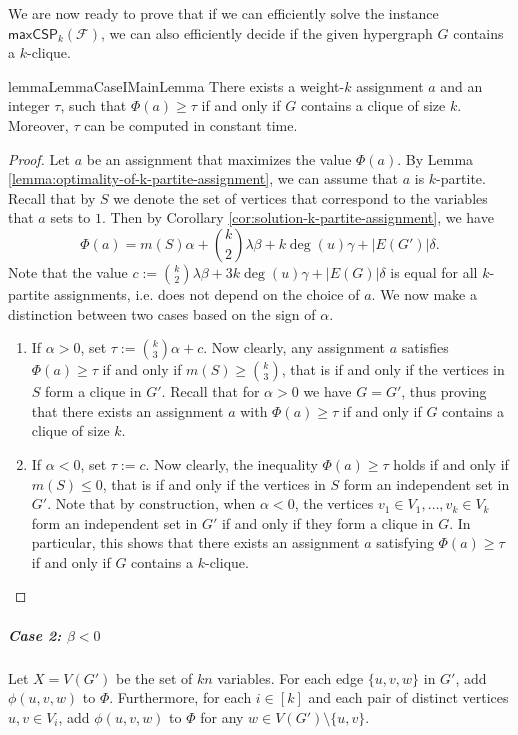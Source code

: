 \documentclass[a4paper,UKenglish,cleveref, autoref, thm-restate,numberwithinsect]{lipics-v2021}
\newcommand{\maxcspk}{\textsf{maxCSP}_{k}}
\newcommand{\Fam}{\mathcal{F}}
\begin{document}
We are now ready to prove that if we can efficiently solve the instance $\maxcspk(\Fam)$, we can also efficiently decide if the given hypergraph $G$ contains a $k$-clique.
\begin{restatable}{lemma}{LemmaCaseIMainLemma}\label{lemma:case-1-main-lemma}
    There exists a weight-$k$ assignment $a$ and an integer $\tau$, such that $\Phi(a)\geq \tau$ if and only if $G$ contains a clique of size $k$. Moreover, $\tau$ can be computed in constant time.
\end{restatable}
\begin{proof} 
    Let $a$ be an assignment that maximizes the value $\Phi(a)$.
    By Lemma \ref{lemma:optimality-of-k-partite-assignment}, we can assume that $a$ is $k$-partite.
    Recall that by $S$ we denote the set of vertices that correspond to the variables that $a$ sets to $1$.
    Then by Corollary \ref{cor:solution-k-partite-assignment}, we have 
    \[
     \Phi(a) = m(S)\alpha + \binom{k}{2} \lambda \beta + k \deg(u) \gamma + |E(G')| \delta.
    \]
    Note that the value $c:=\binom{k}{2} \lambda \beta + 3 k \deg(u) \gamma + |E(G)| \delta$ is equal for all $k$-partite assignments, i.e. does not depend on the choice of $a$.
    We now make a distinction between two cases based on the sign of $\alpha$.
    \begin{enumerate}
        \item If $\alpha>0$, set $\tau := \binom{k}{3}\alpha + c$. Now clearly, any assignment $a$ satisfies $\Phi(a)\ge \tau$ if and only if $m(S) \geq \binom{k}{3}$, that is if and only if the vertices in $S$ form a clique in $G'$.
        Recall that for $\alpha >0$ we have $G=G'$, thus proving that there exists an assignment $a$ with $\Phi(a)\ge \tau$ if and only if $G$ contains a clique of size $k$. 
        \item If $\alpha<0$, set $\tau := c$. Now clearly, the inequality $\Phi(a)\ge \tau$ holds if and only if $m(S) \leq 0$, that is if and only if the vertices in $S$ form an independent set in $G'$.
        Note that by construction, when $\alpha<0$, the vertices $v_1\in V_1,\dots, v_k\in V_k$ form an independent set in $G'$ if and only if they form a clique in $G$.
        In particular, this shows that there exists an assignment $a$ satisfying $\Phi(a)\ge \tau$ if and only if $G$ contains a $k$-clique. \qedhere
    \end{enumerate}
\end{proof}
\subparagraph*{{Case 2: $\beta<0$}}
\begin{construction}\label{construction:b<0}
    Let $X = V(G')$ be the set of $kn$ variables.
    For each edge $\{u,v,w\}$ in $G'$, add $\phi(u,v,w)$ to $\Phi$.
    Furthermore, for each $i\in [k]$ and each pair of distinct vertices $u,v\in V_i$, add $\phi(u,v,w)$ to $\Phi$ for any $w\in V(G')\setminus\{u,v\}$.
\end{construction}
\end{document}
